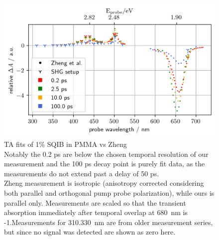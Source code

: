 \documentclass[twoside,openright]{scrreprt}
\begin{document}
{\begin{figure}[hbtp]
\centering
\includegraphics[scale=1]{images/wavScanVsZheng.png}
\caption{TA fits of 1\% SQIB in PMMA vs Zheng\protect\cite{Zheng2020}\\ Notably the 0.2 ps are below the chosen temporal resolution of our measurement and the 100 ps decay point is purely fit data, as the measurements do not extend past a delay of 50 ps.\\
Zheng measurement is isotropic (anisotropy corrected considering both parallel and orthogonal pump probe polarization), while ours is parallel only. Measurements are scaled so that the transient absorption immediately after temporal overlap at \SI{680}{\nano\meter} is -1.Measurements for \SIlist{310, 330}{\nano\meter} are from older measurement series, but since no signal was detected are shown as zero here.\label{fig:TA_vsZheng}}
\end{figure}

}
\end{document}
